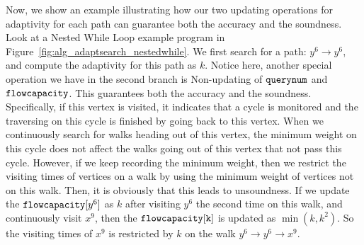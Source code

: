 Now, we show an example illustrating how our two updating operations for adaptivity 
for each path can guarantee both the accuracy and the soundness. 
Look at a Nested While Loop example program in Figure~\ref{fig:alg_adaptsearch_nestedwhile}.
We first search for a path: $y^6 \to y^6$, and compute the adaptivity for this path as 
$k$.
Notice here, another special operation we have in the second branch is Non-updating of
$\mathtt{querynum}$ and $\mathtt{flowcapacity}$.
This guarantees both the accuracy and the soundness.
Specifically,
if this vertex is visited, it indicates that a cycle is monitored and  
the traversing on this cycle is finished by going back to this vertex.
%
When we continuously search for walks heading out of this vertex, 
the minimum weight on this cycle does not affect the walks going out of this vertex that not pass this cycle.
However, if we keep recording the minimum weight, then we
restrict the visiting times of vertices on a walk by
using the minimum weight of vertices not on this walk.
Then, it is obviously that this leads to unsoundness.
If we update the $\mathtt{flowcapacity}[y^6]$ as $k$ after visiting $y^6$ the second time 
on this walk,
and continuously visit $x^9$,
then the $\mathtt{flowcapacity[k]}$ is 
updated as $\min(k, k^2)$.
So
the visiting times of $x^9$ is restricted by $k$ on the walk $y^6 \to y^6 \to x^9$.
